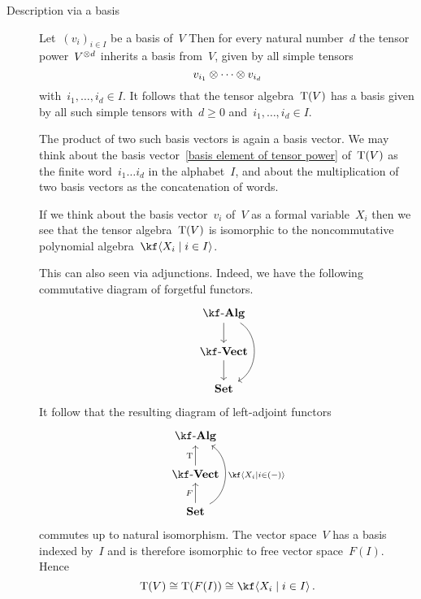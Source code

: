\begin{recall}
\begin{description}
		\item[Description via a basis]
			Let~$(v_i)_{i \in I}$ be a basis of~$V$
			Then for every natural number~$d$ the tensor power~$V^{\otimes d}$ inherits a basis from~$V$, given by all simple tensors
			\begin{equation}
				\label{basis element of tensor power}
				v_{i_1} \otimes \dotsb \otimes v_{i_d}
			\end{equation}
			with~$i_1, \dotsc, i_d \in I$.
			It follows that the tensor algebra~$\operatorname{T}(V)$ has a basis given by all such simple tensors with~$d \geq 0$ and~$i_1, \dotsc, i_d \in I$.

			The product of two such basis vectors is again a basis vector.
			We may think about the basis vector~\eqref{basis element of tensor power} of~$\operatorname{T}(V)$ as the finite word~$i_1 \dotso i_d$ in the alphabet~$I$, and about the multiplication of two basis vectors as the concatenation of words.
			
			If we think about the basis vector~$v_i$ of~$V$ as a formal variable~$X_i$ then we see that the tensor algebra~$\operatorname{T}(V)$ is isomorphic to the noncommutative polynomial algebra~$\kf\gen{X_i \suchthat i \in I}$.

			This can also seen via adjunctions.
			Indeed, we have the following commutative diagram of forgetful functors.
			\[
				\begin{tikzcd}
					\cAlg{\kf}
					\arrow{d}
					\arrow[bend left = 60]{dd}
					\\
					\cVect{\kf}
					\arrow{d}
					\\
					\cSet
				\end{tikzcd}
			\]
			It follow that the resulting diagram of left-adjoint functors
			\[
				\begin{tikzcd}
					\cAlg{\kf}
					\\
					\cVect{\kf}
					\arrow{u}[left]{\Tensor}
					\\
					\cSet
					\arrow{u}[left]{F}
					\arrow[bend right = 60]{uu}[right]{\kf\gen{X_i \suchthat i \in (-)}}
				\end{tikzcd}
			\]
			commutes up to natural isomorphism.
			The vector space~$V$ has a basis indexed by~$I$ and is therefore isomorphic to free vector space~$F(I)$.
			Hence
			\[
				\Tensor(V)
				\cong
				\Tensor(F(I))
				\cong
				\kf\gen{X_i \suchthat i \in I} \,.
			\]
	\end{description}
\end{recall}





